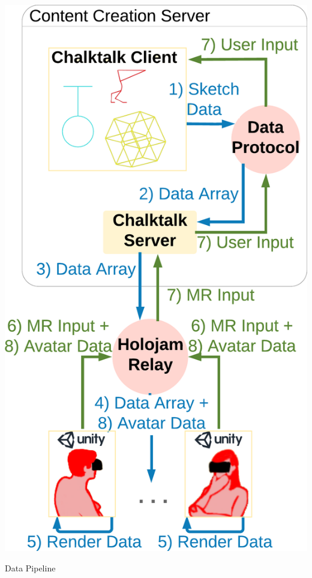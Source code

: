 \documentclass[sigchi-a]{acmart}
\begin{document}
\begin{marginfigure}
    \includegraphics[width=0.85\marginparwidth]{dataflow2}
    \caption{Data Pipeline}
    \label{fig:datapipeline}
\end{marginfigure}
\end{document}
